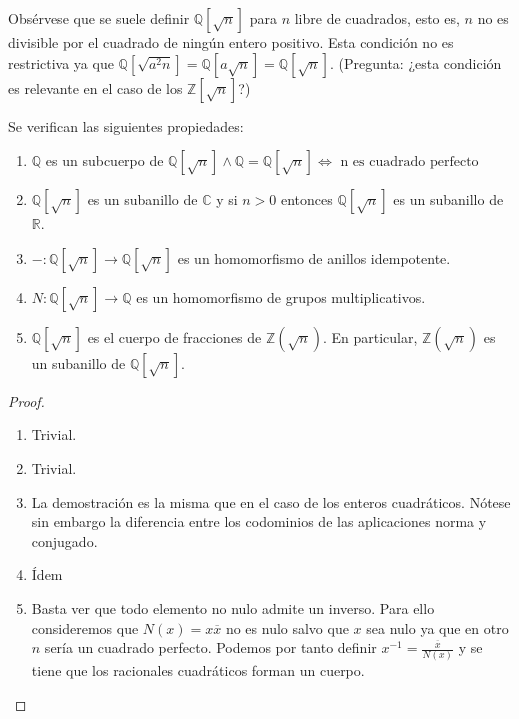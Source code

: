 Obsérvese que se suele definir $\mathbb{Q}[\sqrt{n}]$ para $n$ libre de cuadrados, esto es, $n$ no es divisible por el cuadrado de ningún entero positivo. Esta condición no es restrictiva ya que $\mathbb{Q}[\sqrt{a^2n}] = \mathbb{Q}[a\sqrt{n}] = \mathbb{Q}[\sqrt{n}]$. (Pregunta: ¿esta condición es relevante en el caso de los $\mathbb{Z}[\sqrt{n}]$?)

\begin{proposition}
Se verifican las siguientes propiedades: 
\begin{enumerate}
\item $\mathbb{Q}$ es un subcuerpo de $\mathbb{Q}[\sqrt{n}] \land \mathbb{Q} = \mathbb{Q}[\sqrt{n}] \iff \text{ n es cuadrado perfecto }$
\item  $\mathbb{Q}[\sqrt{n}]$ es un subanillo de $\mathbb{C}$ y si $n > 0$ entonces $\mathbb{Q}[\sqrt{n}]$ es un subanillo de $\mathbb{R}$. 
\item $-:\mathbb{Q}[\sqrt{n}] \to \mathbb{Q}[\sqrt{n}]$ es un homomorfismo de anillos idempotente.
\item $N:\mathbb{Q}[\sqrt{n}] \to \mathbb{Q}$ es un homomorfismo de grupos multiplicativos.
\item $\mathbb{Q}[\sqrt{n}]$ es el cuerpo de fracciones de $\mathbb{Z}(\sqrt{n})$. En particular, $\mathbb{Z}(\sqrt{n})$ es un subanillo de $\mathbb{Q}[\sqrt{n}]$.
\end{enumerate}
\end{proposition}
\begin{proof}
\begin{enumerate}
\item Trivial. 
\item Trivial.
\item La demostración es la misma que en el caso de los enteros cuadráticos. Nótese sin embargo la diferencia entre los codominios de las aplicaciones norma y conjugado.
\item Ídem
\item Basta ver que todo elemento no nulo admite un inverso. Para ello consideremos que $N(x) = x \overline{x}$ no es nulo salvo que $x$ sea nulo ya que en otro $n$ sería un cuadrado perfecto. Podemos por tanto definir $x^{-1} = \frac{\overline{x}}{N(x)}$ y se tiene que los racionales cuadráticos forman un cuerpo. 
\end{enumerate}
\end{proof}